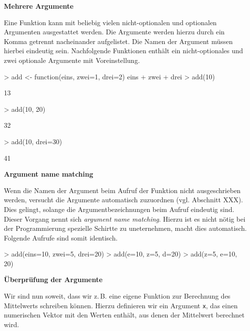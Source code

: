 \documentclass[12pt, a4paper,twoside,openany,x11names,svgnames]{memoir}
\begin{document}
\vspace*{5mm}


\textbf{Mehrere Argumente} 

Eine Funktion kann mit beliebig vielen nicht-optionalen und optionalen Argumenten ausgestattet werden. Die Argumente werden hierzu durch ein Komma getrennt nacheinander aufgelistet. Die Namen der Argument müssen hierbei eindeutig sein. Nachfolgende Funktionen enthält ein nicht-optionales und zwei optionale Argumente mit Voreinstellung.

\begin{Schunk}
\begin{Sinput}
> add <- function(eins, zwei=1, drei=2){
   eins + zwei + drei
 }
> add(10)
\end{Sinput}
\begin{Soutput}
[1] 13
\end{Soutput}
\begin{Sinput}
> add(10, 20)
\end{Sinput}
\begin{Soutput}
[1] 32
\end{Soutput}
\begin{Sinput}
> add(10, drei=30)
\end{Sinput}
\begin{Soutput}
[1] 41
\end{Soutput}
\end{Schunk}


\textbf{Argument name matching} 

Wenn die Namen der Argument beim Aufruf der Funktion nicht ausgeschrieben werden, versucht \R{} die Argumente automatisch zuzuordnen (vgl. Abschnitt XXX). Dies gelingt, solange die Argumentbezeichnungen beim Aufruf eindeutig sind. Dieser Vorgang nennt sich \emph{argument name matching}. Hierzu ist es nicht nötig bei der Programmierung spezielle Schirtte zu uneternehmen, \R{} macht dies automatisch. Folgende Aufrufe sind somit identisch.

\begin{Schunk}
\begin{Sinput}
> add(eins=10, zwei=5, drei=20)
> add(e=10, z=5, d=20)
> add(z=5, e=10, 20)
\end{Sinput}
\end{Schunk}

\vspace*{5mm}

\textbf{Überprüfung der Argumente}

Wir sind nun soweit, dass wir z.\,B. eine eigene Funktion zur Berechnung des Mittelwerts schreiben können. Hierzu definieren wir ein Argument \texttt{x}, das einen numerischen Vektor mit den Werten enthält, aus denen der Mittelwert berechnet wird. 
\end{document}
